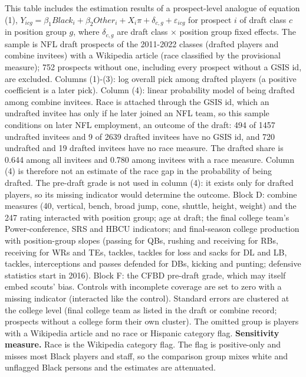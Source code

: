 \begin{table}[!h]
{\begin{threeparttable}
\begin{tablenotes}[para]
\item This table includes the estimation results of a prospect-level analogue of equation (1), $Y_{icg} = \beta_1 Black_i + \beta_2 Other_i + X_i\pi + \delta_{c,g} + \varepsilon_{icg}$ for prospect $i$ of draft class $c$ in position group $g$, where $\delta_{c,g}$ are draft class $\times$ position group fixed effects. The sample is NFL draft prospects of the 2011-2022 classes (drafted players and combine invitees) with a Wikipedia article (race classified by the provisional measure); 752 prospects without one, including every prospect without a GSIS id, are excluded. Columns (1)-(3): log overall pick among drafted players (a positive coefficient is a later pick). Column (4): linear probability model of being drafted among combine invitees. Race is attached through the GSIS id, which an undrafted invitee has only if he later joined an NFL team, so this sample conditions on later NFL employment, an outcome of the draft: 494 of 1457 undrafted invitees and 9 of 2639 drafted invitees have no GSIS id, and 720 undrafted and 19 drafted invitees have no race measure. The drafted share is 0.644 among all invitees and 0.780 among invitees with a race measure. Column (4) is therefore not an estimate of the race gap in the probability of being drafted. The pre-draft grade is not used in column (4): it exists only for drafted players, so its missing indicator would determine the outcome. Block D: combine measures (40, vertical, bench, broad jump, cone, shuttle, height, weight) and the 247 rating interacted with position group; age at draft; the final college team's Power-conference, SRS and HBCU indicators; and final-season college production with position-group slopes (passing for QBs, rushing and receiving for RBs, receiving for WRs and TEs, tackles, tackles for loss and sacks for DL and LB, tackles, interceptions and passes defended for DBs, kicking and punting; defensive statistics start in 2016). Block F: the CFBD pre-draft grade, which may itself embed scouts' bias. Controls with incomplete coverage are set to zero with a missing indicator (interacted like the control). Standard errors are clustered at the college level (final college team as listed in the draft or combine record; prospects without a college form their own cluster). The omitted group is players with a Wikipedia article and no race or Hispanic category flag. \textbf{Sensitivity measure.} Race is the Wikipedia category flag. The flag is positive-only and misses most Black players and staff, so the comparison group mixes white and unflagged Black persons and the estimates are attenuated.
\end{tablenotes}
\end{threeparttable}}
\end{table}
